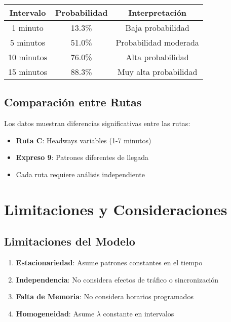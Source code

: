\documentclass[12pt,a4paper]{article}
\begin{document}
\begin{center}
\begin{tabular}{|c|c|c|}
\hline
\textbf{Intervalo} & \textbf{Probabilidad} & \textbf{Interpretación} \\
\hline
1 minuto & 13.3\% & Baja probabilidad \\
5 minutos & 51.0\% & Probabilidad moderada \\
10 minutos & 76.0\% & Alta probabilidad \\
15 minutos & 88.3\% & Muy alta probabilidad \\
\hline
\end{tabular}
\end{center}

\subsection{Comparación entre Rutas}

Los datos muestran diferencias significativas entre las rutas:

\begin{itemize}
    \item \textbf{Ruta C}: Headways variables (1-7 minutos)
    \item \textbf{Expreso 9}: Patrones diferentes de llegada
    \item Cada ruta requiere análisis independiente
\end{itemize}

\section{Limitaciones y Consideraciones}

\subsection{Limitaciones del Modelo}

\begin{enumerate}
    \item \textbf{Estacionariedad}: Asume patrones constantes en el tiempo
    \item \textbf{Independencia}: No considera efectos de tráfico o sincronización
    \item \textbf{Falta de Memoria}: No considera horarios programados
    \item \textbf{Homogeneidad}: Asume $\lambda$ constante en intervalos
\end{enumerate}
\end{document}
